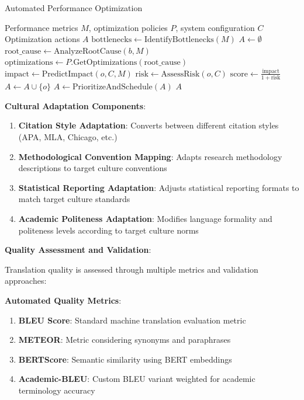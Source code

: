 \documentclass[10pt,twocolumn]{article}
\begin{document}
\begin{algorithm}[H]
\caption{Automated Performance Optimization}
\label{alg:performance_optimization}
\begin{algorithmic}[1]
\REQUIRE Performance metrics $M$, optimization policies $P$, system configuration $C$
\ENSURE Optimization actions $A$
\STATE $\text{bottlenecks} \leftarrow \text{IdentifyBottlenecks}(M)$
\STATE $A \leftarrow \emptyset$
    \STATE $\text{root\_cause} \leftarrow \text{AnalyzeRootCause}(b, M)$
    \STATE $\text{optimizations} \leftarrow P.\text{GetOptimizations}(\text{root\_cause})$
        \STATE $\text{impact} \leftarrow \text{PredictImpact}(o, C, M)$
        \STATE $\text{risk} \leftarrow \text{AssessRisk}(o, C)$
        \STATE $\text{score} \leftarrow \frac{\text{impact}}{1 + \text{risk}}$
            \STATE $A \leftarrow A \cup \{o\}$
        \ENDIF
    \ENDFOR
\ENDFOR
\STATE $A \leftarrow \text{PrioritizeAndSchedule}(A)$
\RETURN $A$
\end{algorithmic}
\end{algorithm}

\textbf{Cultural Adaptation Components}:
\begin{enumerate}
    \item \textbf{Citation Style Adaptation}: Converts between different citation styles (APA, MLA, Chicago, etc.)
    \item \textbf{Methodological Convention Mapping}: Adapts research methodology descriptions to target culture conventions
    \item \textbf{Statistical Reporting Adaptation}: Adjusts statistical reporting formats to match target culture standards
    \item \textbf{Academic Politeness Adaptation}: Modifies language formality and politeness levels according to target culture norms
\end{enumerate}

\textbf{Quality Assessment and Validation}:

Translation quality is assessed through multiple metrics and validation approaches:

\textbf{Automated Quality Metrics}:
\begin{enumerate}
    \item \textbf{BLEU Score}: Standard machine translation evaluation metric
    \item \textbf{METEOR}: Metric considering synonyms and paraphrases
    \item \textbf{BERTScore}: Semantic similarity using BERT embeddings
    \item \textbf{Academic-BLEU}: Custom BLEU variant weighted for academic terminology accuracy
\end{enumerate}
\end{document}
